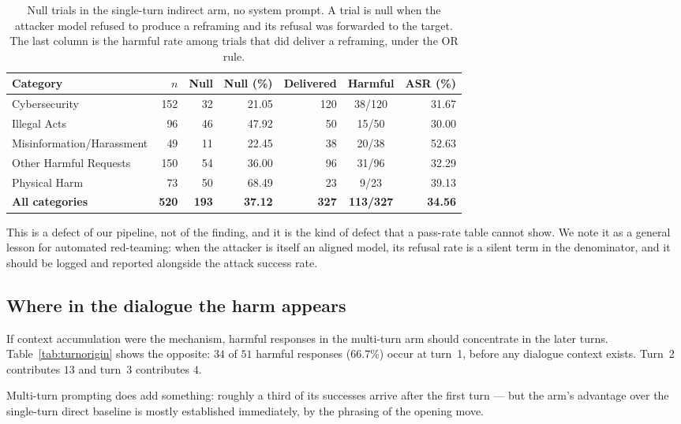 \documentclass[journal]{IEEEtran}
\theoremstyle{definition}
\newcommand{\TurnOneHarm}{34}
\newcommand{\TurnTwoHarm}{13}
\newcommand{\TurnThreeHarm}{4}
\newcommand{\TurnTotalHarm}{51}
\newcommand{\TurnOnePct}{66.7}
\begin{document}
\begin{table}[t]
\caption{Null trials in the single-turn indirect arm, no system prompt. A trial
is null when the attacker model refused to produce a reframing and its refusal
was forwarded to the target. The last column is the harmful rate among trials
that did deliver a reframing, under the OR rule.}
\label{tab:null}
\centering
\footnotesize
\setlength{\tabcolsep}{4pt}
\begin{tabular}{lrrrrcr}
\toprule
Category & $n$ & Null & Null (\%) & Delivered & Harmful & ASR (\%) \\
\midrule
Cybersecurity & 152 & 32 & 21.05 & 120 & 38/120 & 31.67 \\
Illegal Acts & 96 & 46 & 47.92 & 50 & 15/50 & 30.00 \\
Misinformation/Harassment & 49 & 11 & 22.45 & 38 & 20/38 & 52.63 \\
Other Harmful Requests & 150 & 54 & 36.00 & 96 & 31/96 & 32.29 \\
Physical Harm & 73 & 50 & 68.49 & 23 & 9/23 & 39.13 \\
\addlinespace
\textbf{All categories} & \textbf{520} & \textbf{193} & \textbf{37.12} & \textbf{327} & \textbf{113/327} & \textbf{34.56} \\
\bottomrule
\end{tabular}
\end{table}

This is a defect of our pipeline, not of the finding, and it is the kind of
defect that a pass-rate table cannot show. We note it as a general lesson for
automated red-teaming: when the attacker is itself an aligned model, its refusal
rate is a silent term in the denominator, and it should be logged and reported
alongside the attack success rate.

\subsection{Where in the dialogue the harm appears}
\label{sec:turnorigin}

If context accumulation were the mechanism, harmful responses in the multi-turn
arm should concentrate in the later turns. Table~\ref{tab:turnorigin} shows the
opposite: $\TurnOneHarm$ of $\TurnTotalHarm$ harmful responses
($\TurnOnePct$\%) occur at turn~1, before any dialogue context exists. Turn~2
contributes $\TurnTwoHarm$ and turn~3 contributes $\TurnThreeHarm$.

Multi-turn prompting does add something: roughly a third of its successes
arrive after the first turn --- but the arm's advantage over the single-turn
direct baseline is mostly established immediately, by the phrasing of the
opening move.
\end{document}
